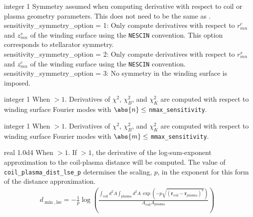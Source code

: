 \myhrule

{integer}
{1}
{Symmetry assumed when computing derivative with respect to coil or plasma geometry parameters. This does not need to be the same as .}
{\\
{\ttfamily sensitivity\_symmetry\_option = 1}: Only compute derivatives with respect to $r_{mn}^c$ and $z_{mn}^s$ of the winding surface using the \texttt{NESCIN} convention. This option corresponds to stellarator symmetry. \\
{\ttfamily sensitivity\_symmetry\_option = 2}: Only compute derivatives with respect to $r_{mn}^s$ and $z_{mn}^c$ of the winding surface using the \texttt{NESCIN} convention. \\
{\ttfamily sensitivity\_symmetry\_option = 3}: No symmetry in the winding surface is imposed.}

\myhrule

{integer}
{1}
{When  $> 1$.}
{Derivatives of $\chi^2$, $\chi^2_B$, and $\chi^2_K$ are computed with respect to winding surface Fourier modes with $\abs{n} \leq$ \texttt{nmax\_sensitivity}.}

\myhrule

{integer}
{1}
{When  $> 1$.}
{Derivatives of $\chi^2$, $\chi^2_B$, and $\chi^2_K$ are computed with respect to winding surface Fourier modes with $\abs{m} \leq$ \texttt{mmax\_sensitivity}.}

\myhrule

{real}
{1.0d4}
{When $> 1$.}
{If  $> 1$, the derivative of the log-sum-exponent approximation to the coil-plasma distance will be computed. The value of \texttt{coil\_plasma\_dist\_lse\_p} determines the scaling, $p$, in the exponent for this form of the distance approximation.
\begin{gather}
d_{\min,\text{lse}} = - \frac{1}{p} \log \left( \frac{ \int_{\text{coil}} d^2 A \int_{\text{plasma}} d^2 A \, \exp \left( - p \sqrt{ (\bm{r}_{\text{coil}}- \bm{r}_{\text{plasma}})^2} \right)}{A_{\text{coil}} A_{\text{plasma}}} \right)
\end{gather}
 }

\myhrule

